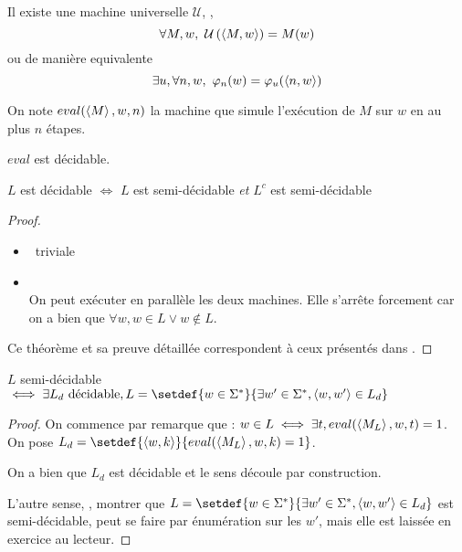 \begin{lemma}\label{lem:univ}
	Il existe une machine universelle $\mathcal U$, \ie, $$\forall M,w, \  \mathcal U \left(\left\langle M,w\right\rangle\right) = M (w)$$
	ou de manière equivalente
	$$\exists u, \forall n,w, \ \varphi_n(w) = \varphi_u(\left\langle n,w\right\rangle)$$
\end{lemma}

\begin{definition}[eval]
	On note $eval(\left\langle M\right\rangle, w, n)$ la machine que simule l'exécution de $M$ sur $w$ en au plus $n$ étapes.
\end{definition}

\begin{prop}[Admis]
	$eval$ est décidable.
\end{prop}

\begin{prop}
	$L$ est décidable $\iff$ $L$ est semi-décidable \emph{et} $L^c$ est semi-décidable
\end{prop}

\begin{proof}
	\begin{itemize}
		\item \bimpLR \ triviale
		\item \bimpRL \\
		      On peut exécuter en parallèle les deux machines. Elle s'arrête forcement car on a bien que $\forall w, w \in L \lor w \notin L$.
	\end{itemize}
	Ce théorème et sa preuve détaillée correspondent à ceux présentés dans \cite[Theorem~4.22]{sipser}.
\end{proof}


\begin{prop}
	$L$ semi-décidable $\iff \exists L_d \text{ décidable}, L = \setdef {w \in \mots} {\exists w' \in \mots, \encode{w,w'} \in L_d}$
\end{prop}


\begin{proof}
	On commence par remarque que : $w \in L \iff \exists t, eval(\left\langle M_L\right\rangle, w, t) = 1$. On pose
	$L_d = \setdef {\encode{w, k}} {eval(\encode {M_L}, w,k) = 1}$.

	On a bien que $L_d$ est décidable et le sens \bimpLR découle par construction.

	L'autre sense, \ie, montrer que $L = \setdef {w \in \mots} {\exists w' \in \mots, \encode{w,w'} \in L_d}$ est semi-décidable,
	peut se faire par énumération sur les $w'$, mais elle est laissée en exercice au lecteur.
\end{proof}


